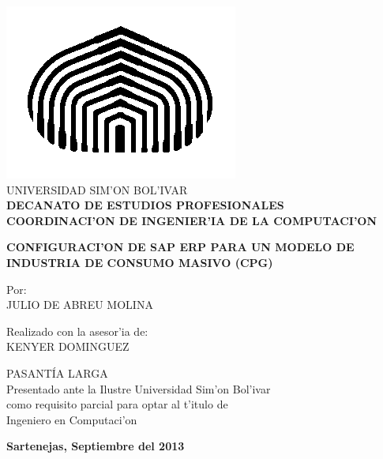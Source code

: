 \begin{titlepage}
\begin{center}

\includegraphics[scale=0.5,type=png,ext=.png,read=.png]{figures/cebolla} \\

\textsc {\large UNIVERSIDAD SIM'ON BOL'IVAR} \\
\textsc{\bfseries DECANATO DE ESTUDIOS PROFESIONALES\\
COORDINACI'ON DE INGENIER'IA DE LA COMPUTACI'ON}

\bigskip
\bigskip
\bigskip
\bigskip
\bigskip
\bigskip
\bigskip
\bigskip
\bigskip

\textsc{\bfseries CONFIGURACI'ON DE SAP ERP PARA UN MODELO DE INDUSTRIA DE CONSUMO MASIVO (CPG)}

\bigskip
\bigskip
\bigskip
\bigskip
\bigskip

\begin{minipage}{\textwidth}
\centering
Por: \\
JULIO DE ABREU MOLINA \\

\bigskip
\bigskip
\bigskip

Realizado con la asesor'ia de: \\
KENYER DOMINGUEZ
\end{minipage}

\bigskip
\bigskip
\bigskip
\bigskip
\bigskip
\bigskip
\bigskip
\bigskip
\bigskip

{PASANT\'IA LARGA \\ Presentado ante la Ilustre Universidad Sim'on Bol'ivar \\
como requisito parcial para optar al t'itulo de \\ Ingeniero en Computaci'on} \\

\bigskip
\bigskip
\vfill

{\large \bfseries Sartenejas, Septiembre del 2013}

\end{center}
\end{titlepage}
